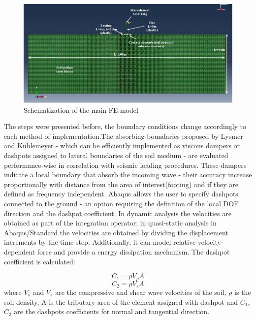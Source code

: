 		\begin{figure}[!h]
			\centering
			\includegraphics[width=0.9\linewidth]{"mainmodel"}
			\caption{Schematization of the main FE model}
			\label{mainM}
		\end{figure}
		
	The steps were presented before, the boundary conditions change accordingly to each method of implementation.The absorbing boundaries proposed by Lysmer and Kuhlemeyer - which can be efficiently implemented as viscous dampers or dashpots assigned to lateral boundaries of the soil medium - are evaluated performance-wise in correlation with seismic loading procedures. These dampers indicate a local boundary that absorb the incoming wave - their accuracy increase proportionally with distance from the area of interest(footing) and if they are defined as frequency independent. Abaqus allows the user to specify dashpots connected to the ground - an option requiring the definition of the local DOF direction and the dashpot coefficient. In dynamic analysis the velocities are obtained as part of the integration operator; in quasi-static analysis in Abaqus/Standard the velocities are obtained by dividing the displacement increments by the time step. Additionally, it can model relative velocity-dependent force and provide a energy dissipation mechanism. The dashpot coefficient is calculated:
	
	\begin{equation}
		C_1=\rho V_p A
	\end{equation}
	\begin{equation}
		C_2=\rho V_s A
	\end{equation}
	where $V_s$ and $V_s$ are the compressive and shear wave velocities of the soil, $\rho$ is the soil density, A is the tributary area of the element assigned with dashpot and $C_1$, $C_2$ are the dashpots coefficients for normal and tangential direction.  
	
